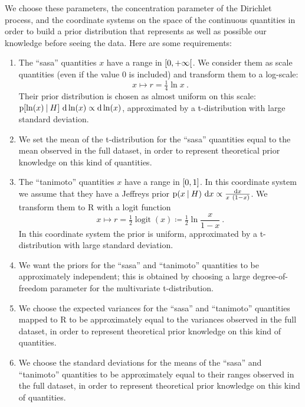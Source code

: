 \documentclass[\ifafour a4paper,12pt,\else a5paper,10pt,\fi%
onecolumn,oneside,article,%
british%
]{memoir}
\theoremstyle{remark}
\theoremstyle{innote}
\newcommand*{\di}{\mathrm{d}}%
\newcommand*{\RR}{\bm{\mathrm{R}}}
\newcommand*{\defd}{\coloneqq}
\DeclarePairedDelimiter\clcl{[}{]}
\DeclarePairedDelimiter\clop{[}{[}
\newcommand*{\p}{\mathrm{p}}%
\renewcommand*{\|}[1][]{\nonscript\:#1\vert\nonscript\:\mathopen{}}
\renewcommand*{\=}{\TextOrMath\texteq\eq}
\DeclareMathOperator*{\logit}{logit}
\begin{document}
We choose these parameters, the concentration parameter of the Dirichlet
process, and the coordinate systems on the space of the continuous
quantities in order to build a prior distribution that represents as well
as possible our knowledge before seeing the data. Here are some
requirements:
\begin{enumerate}[label=(\alph*)]
\item The \enquote{sasa} quantities $x$ have a range in $\clop{0,+\infty}$.
  We consider them as scale quantities (even if the value $0$ is included)
  and transform them to a log-scale:
    \begin{equation}
    \label{eq:log_sasa}
    x \mapsto r = \tfrac{1}{4}\ln x \ .
  \end{equation}
  Their prior distribution is chosen as almost uniform on this scale:
  $\p[\ln(x) \| H]\ \di\ln(x) \propto \di\ln(x)$, approximated by a
  t-distribution with large standard deviation.

\item We set the mean of the t-distribution for the \enquote{sasa}
  quantities equal to the mean observed in the full dataset, in order to represent
  theoretical prior knowledge on this kind of quantities.

\item The \enquote{tanimoto} quantities $x$ have a range in $\clcl{0,1}$.
  In this coordinate system we assume that they have a Jeffreys prior $\p(x
  \| H)\ \di x \propto \frac{\di x}{x\ (1-x)}$.
  We transform them to $\RR$ with a logit function
  \begin{equation}
    \label{eq:logit_tanimoto}
    x \mapsto r = \tfrac{1}{2}\logit(x) \defd \tfrac{1}{2}\ln\frac{x}{1-x} \ .
  \end{equation}
In this coordinate system the prior is uniform, approximated by a
t-distribution with large standard deviation.

\item We want the priors for the \enquote{sasa} and \enquote{tanimoto}
  quantities to be approximately independent; this is obtained by choosing
  a large degree-of-freedom parameter for the multivariate t-distribution.
\item We choose the expected variances for the \enquote{sasa} and
  \enquote{tanimoto} quantities mapped to $\RR$ to be approximately equal
  to the variances observed in the full dataset, in order to represent
  theoretical prior knowledge on this kind of quantities.
\item We choose the standard deviations for the means of the \enquote{sasa}
  and \enquote{tanimoto} quantities to be approximately equal to their
  ranges observed in the full dataset, in order to represent theoretical
  prior knowledge on this kind of quantities.
\end{enumerate}
\end{document}
